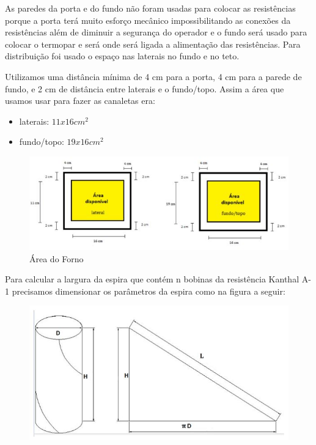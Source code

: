 As paredes da porta e do fundo não foram usadas para colocar as resistências porque a porta terá muito esforço mecânico impossibilitando as conexões da resistências além de diminuir a segurança do operador e o fundo será usado para colocar o termopar e será onde será ligada a alimentação das resistências. Para distribuição foi usado o espaço nas laterais no fundo e no teto.

Utilizamos uma distância mínima de 4 cm para a porta, 4 cm para a parede de fundo, e 2 cm de distância entre laterais e o fundo/topo. Assim a área que usamos usar para fazer as canaletas era:
\begin{itemize}
	\item laterais: $11x16cm^2$
	\item fundo/topo: $19x16cm^2$
\end{itemize}
\begin{figure}[H]
	\centering
	\label{areaforno}
	\includegraphics[keepaspectratio=true,scale=1.0]{figuras/alimentacao2.JPG}
	\caption{Área do Forno}
\end{figure}

Para calcular a largura da espira que contém n bobinas da resistência Kanthal A-1 precisamos dimensionar os parâmetros da espira como na figura a seguir:
\begin{figure}[H]
	\centering
	\label{areaforno}
	\includegraphics[keepaspectratio=true,scale=0.6]{figuras/alimentacao3.JPG}
\end{figure}


